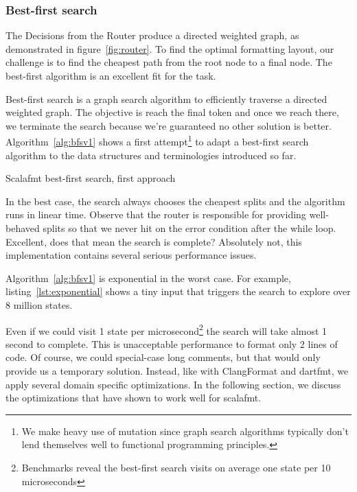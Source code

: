 \subsubsection{Best-first search}
The Decisions from the Router produce a directed weighted graph, as demonstrated in figure~\ref{fig:router}.
To find the optimal formatting layout, our challenge is to find the cheapest path from the root node to a final node.
The best-first\autocite{pearl_heuristics:_1984} algorithm is an excellent fit for the task.

Best-first search is a graph search algorithm to efficiently traverse a directed weighted graph.
The objective is reach the final token and once we reach there, we terminate the search because we're guaranteed no other solution is better.
Algorithm~\ref{alg:bfsv1} shows a first attempt\footnote{
  We make heavy use of mutation since graph search algorithms typically don't lend themselves well to functional programming principles.
} to adapt a best-first search algorithm to the data structures and terminologies introduced so far.
\begin{algorithm}
  \caption{Scalafmt best-first search, first approach}\label{alg:bfsv1}
  
\end{algorithm}
In the best case, the search always chooses the cheapest splits and the algorithm runs in linear time.
Observe that the router is responsible for providing well-behaved splits so that we never hit on the error condition after the while loop.
Excellent, does that mean the search is complete?
Absolutely not, this implementation contains several serious performance issues.

Algorithm~\ref{alg:bfsv1} is exponential in the worst case.
For example, listing~\ref{lst:exponential} shows a tiny input that triggers the search to explore over 8 million states.

Even if we could visit 1 state per microsecond\footnote{
  Benchmarks reveal the best-first search visits on average one state per 10 microseconds
} the search will take almost 1 second to complete.
This is unacceptable performance to format only 2 lines of code.
Of course, we could special-case long comments, but that would only provide us a temporary solution.
Instead, like with ClangFormat and dartfmt, we apply several domain specific optimizations.
In the following section, we discuss the optimizations that have shown to work well for scalafmt.

